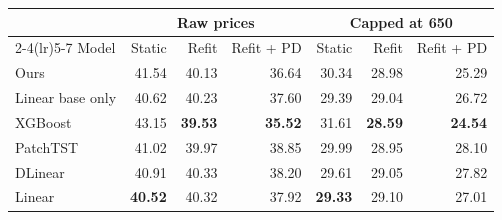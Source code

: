 \begin{tabular}{lrrrrrr}
\toprule
& \multicolumn{3}{c}{Raw prices} & \multicolumn{3}{c}{Capped at 650} \\
\cmidrule(lr){2-4}\cmidrule(lr){5-7}
Model & Static & Refit & Refit + PD & Static & Refit & Refit + PD \\
\midrule
Ours & 41.54 & 40.13 & 36.64 & 30.34 & 28.98 & 25.29 \\
Linear base only & 40.62 & 40.23 & 37.60 & 29.39 & 29.04 & 26.72 \\
XGBoost & 43.15 & \textbf{39.53} & \textbf{35.52} & 31.61 & \textbf{28.59} & \textbf{24.54} \\
PatchTST & 41.02 & 39.97 & 38.85 & 29.99 & 28.95 & 28.10 \\
DLinear & 40.91 & 40.33 & 38.20 & 29.61 & 29.05 & 27.82 \\
Linear & \textbf{40.52} & 40.32 & 37.92 & \textbf{29.33} & 29.10 & 27.01 \\
\bottomrule
\end{tabular}
